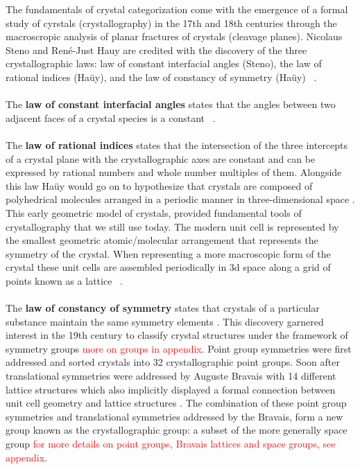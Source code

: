 The fundamentals of crystal categorization come with the emergence of a formal study of cyrstals (crystallography) in the 17th and 18th centuries through the macroscropic analysis of planar fractures of crystals (cleavage planes). Nicolaus Steno and René-Just Hauy are credited with the discovery of the three crystallographic laws: law of constant interfacial angles (Steno), the law of rational indices (Haüy), and the law of constancy of symmetry (Haüy) ~\cite{aroyo}.
\\
\\
The \textbf{law of constant interfacial angles} states that the angles between two adjacent faces of a crystal species is a constant ~\cite{steno}.
\\
\\
The \textbf{law of rational indices} states that the intersection of the three intercepts of a crystal plane with the crystallographic axes are constant and can be expressed by rational numbers and whole number multiples of them. Alongside this law Haüy would go on to hypothesize that crystals are composed of polyhedrical molecules arranged in a periodic manner in three-dimensional space \cite{hauy}. This early geometric model of crystals, provided fundamental tools of crystallography that we still use today. The modern unit cell is represented by the smallest geometric atomic/molecular arrangement that represents the symmetry of the crystal. When representing a more macroscopic form of the crystal these unit cells are assembled periodically in 3d space along a grid of points known as a lattice ~\cite{sands}.
\\
\\
The \textbf{law of constancy of symmetry} states that crystals of a particular substance maintain the same symmetry elements \cite{hauy}. This discovery garnered interest in the 19th century to classify crystal structures under the framework of symmetry groups \textcolor{red}{more on groups in appendix}. Point group symmetries were first addressed and sorted crystals into 32 crystallographic point groups. Soon after translational symmetries were addressed by Auguste Bravais with 14 different lattice structures which also implicitly displayed a formal connection between unit cell geometry and lattice structures \cite{aroyo}. The combination of these point group symmetries and translational symmetries addressed by the Bravais, form a new group known as the crystallographic group: a subset of the more generally space group \textcolor{red}{for more details on point groups, Bravais lattices and space groups, see appendix}.
